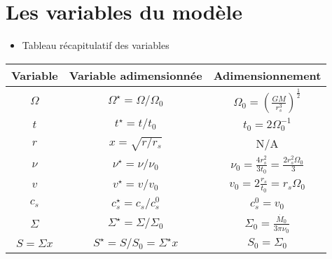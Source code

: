 \section{Les variables du modèle}
\begin{frame}
\begin{itemize}
	\item {Tableau récapitulatif des variables}
\end{itemize}

\begin{center}
    \begin{tabular}{|c|c|c|}
        \hline
        Variable & Variable adimensionnée & Adimensionnement \\
        \hline
        $\Omega$ & $\Omega^\star = \Omega/\Omega_0$ & $\Omega_0 = \left( \frac{G M}{r^3_s} \right)^\frac{1}{2}$ \\
        $t$ & $t^\star = t/t_0$ & $t_0 = 2 \Omega_0^{-1}$ \\
        $r$ & $x = \sqrt{r/r_s}$ & N/A \\
        $\nu$ & $\nu^\star = \nu/\nu_0$ & $\nu_0 = \frac{4 r_s^2}{3 t_0} = \frac{2 r_s^2 \Omega_0}{3}$ \\
        $v$ & $v^\star = v/v_0$ & $v_0 = 2 \frac{r_s}{t_0} = r_s \Omega_0$ \\
        $c_s$ & $c_s^\star = c_s/c_s^0$ & $c_s^0 = v_0$ \\
        $\Sigma$ & $\Sigma^\star = \Sigma/\Sigma_0$ & $\Sigma_0 = \frac{\dot{M_0}}{3 \pi \nu_0}$ \\
        $S = \Sigma x$ & $S^\star = S/S_0 = \Sigma^\star x$ & $S_0 = \Sigma_0$ \\
        \hline
    \end{tabular}
\end{center}

\end{frame}

